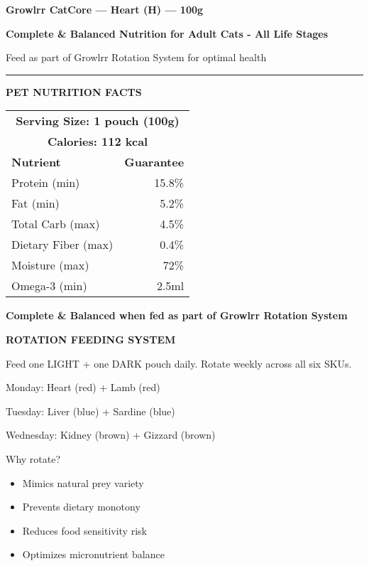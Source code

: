 \documentclass[10pt,a6paper,landscape]{article}
\begin{document}
\begin{multicols}{3}
\setlength{\columnseprule}{0.2pt}

{\Large\bfseries Growlrr CatCore --- Heart (H) --- 100g}

\vspace{2mm}
{\footnotesize\bfseries Complete \& Balanced Nutrition for Adult Cats - All Life Stages}

{\tiny Feed as part of Growlrr Rotation System for optimal health}

\vspace{3mm}
\hrule
\vspace{1mm}

{\small\bfseries PET NUTRITION FACTS}

{\tiny
\begin{tabular}{|p{3cm}|r|}
\hline
\multicolumn{2}{|c|}{\textbf{Serving Size: 1 pouch (100g)}} \\
\multicolumn{2}{|c|}{\textbf{Calories: 112 kcal}} \\
\hline
\textbf{Nutrient} & \textbf{Guarantee} \\
\hline
Protein (min) & 15.8\% \\
Fat (min) & 5.2\% \\
Total Carb (max) & 4.5\% \\
Dietary Fiber (max) & 0.4\% \\
Moisture (max) & 72\% \\
Omega-3 (min) & 2.5ml \\
\hline
\end{tabular}
}

\vspace{2mm}
{\tiny\bfseries Complete \& Balanced when fed as part of Growlrr Rotation System}

\vspace{3mm}
{\small\bfseries ROTATION FEEDING SYSTEM}

{\tiny
Feed one LIGHT + one DARK pouch daily. Rotate weekly across all six SKUs.

Monday: Heart (red) + Lamb (red)

Tuesday: Liver (blue) + Sardine (blue)

Wednesday: Kidney (brown) + Gizzard (brown)

Why rotate?
\begin{itemize}
\item Mimics natural prey variety
\item Prevents dietary monotony
\item Reduces food sensitivity risk
\item Optimizes micronutrient balance
\end{itemize}

}
\end{multicols}
\end{document}
